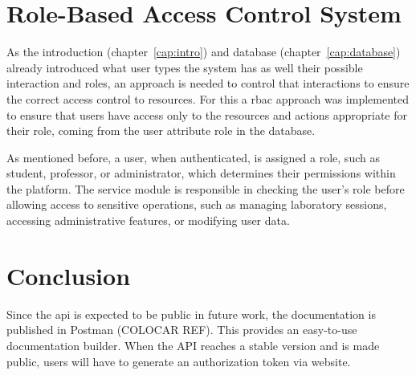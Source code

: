 \section{Role-Based Access Control System}
As the introduction (chapter~\ref{cap:intro}) and database (chapter~\ref{cap:database}) already introduced what user types the system has as well their possible interaction and roles, an approach is needed to control that interactions to ensure the correct access control to resources. For this a \acf{rbac} approach was implemented to ensure that users have access only to the resources and actions appropriate for their role, coming from the user attribute role in the database. 

As mentioned before, a user, when authenticated, is assigned a role, such as student, professor, or administrator, which determines their permissions within the platform. The service module is responsible in checking the user's role before allowing access to sensitive operations, such as managing laboratory sessions, accessing administrative features, or modifying user data. 

\section{Conclusion}

Since the \acs{api} is expected to be public in future work, the documentation is published in Postman (COLOCAR REF). This provides an easy-to-use documentation builder. When the API reaches a stable version and is made public, users will have to generate an authorization token via website. 